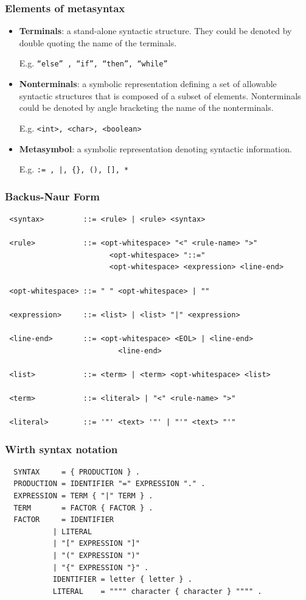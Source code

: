 \documentclass{beamer}
\begin{document}
\begin{frame}
  \frametitle{Elements of metasyntax}
  \begin{itemize}
    \item \textbf{Terminals}: a stand-alone syntactic structure. They could be
      denoted by double quoting the name of the terminals.

      E.g. \texttt{“else” , “if”, “then”, “while”}

      \vfill

    \item \textbf{Nonterminals}: a symbolic representation defining a set of
      allowable syntactic structures that is composed of a subset of elements.
      Nonterminals could be denoted by angle bracketing the name of the
      nonterminals.

      E.g. \texttt{<int>, <char>, <boolean>}

      \vfill

    \item \textbf{Metasymbol}: a symbolic representation denoting syntactic
      information.

      E.g. \texttt{:= , |, \{\}, (), [], *}
  \end{itemize}
\end{frame}

\begin{frame}[fragile,shrink=18]
  \frametitle{Backus-Naur Form}
\begin{verbatim}
 <syntax>         ::= <rule> | <rule> <syntax>

 <rule>           ::= <opt-whitespace> "<" <rule-name> ">"
                        <opt-whitespace> "::="
                        <opt-whitespace> <expression> <line-end>

 <opt-whitespace> ::= " " <opt-whitespace> | ""

 <expression>     ::= <list> | <list> "|" <expression>

 <line-end>       ::= <opt-whitespace> <EOL> | <line-end>
                          <line-end>

 <list>           ::= <term> | <term> <opt-whitespace> <list>

 <term>           ::= <literal> | "<" <rule-name> ">"

 <literal>        ::= '"' <text> '"' | "'" <text> "'"
\end{verbatim}
\end{frame}

\begin{frame}[fragile]
  \frametitle{Wirth syntax notation}
  \begin{verbatim}
  SYNTAX     = { PRODUCTION } .
  PRODUCTION = IDENTIFIER "=" EXPRESSION "." .
  EXPRESSION = TERM { "|" TERM } .
  TERM       = FACTOR { FACTOR } .
  FACTOR     = IDENTIFIER
           | LITERAL
           | "[" EXPRESSION "]"
           | "(" EXPRESSION ")"
           | "{" EXPRESSION "}" .
           IDENTIFIER = letter { letter } .
           LITERAL    = """" character { character } """" .
  \end{verbatim}
\end{frame}
\end{document}
